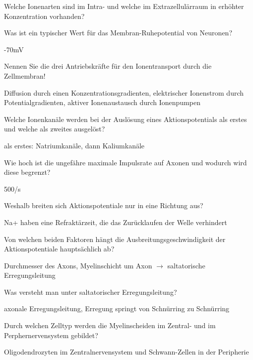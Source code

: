 \documentclass[10pt, a4paper]{exam}
\begin{document}
\begin{questions}
  \question Welche Ionenarten sind im Intra- und welche im Extrazellulärraum in erhöhter Konzentration vorhanden?
  \begin{solution}

  \end{solution}

  \question Was ist ein typischer Wert für das Membran-Ruhepotential von Neuronen?
  \begin{solution}
    -70mV
  \end{solution}

  \question Nennen Sie die drei Antriebskräfte für den Ionentransport durch die Zellmembran!
  \begin{solution}
    Diffusion durch einen Konzentrationsgradienten, elektrischer Ionenstrom durch Potentialgradienten, aktiver Ionenaustausch durch Ionenpumpen
  \end{solution}

  \question Welche Ionenkanäle werden bei der Auslösung eines Aktionspotentials als erstes und welche als zweites ausgelöst?
  \begin{solution}
    als erstes: Natriumkanäle, dann Kaliumkanäle
  \end{solution}

  \question Wie hoch ist die ungefähre maximale Impulsrate auf Axonen und wodurch wird diese begrenzt?
  \begin{solution}
    500/s
  \end{solution}

  \question Weshalb breiten sich Aktionspotentiale nur in eine Richtung aus?
  \begin{solution}
    Na+ haben eine Refraktärzeit, die das Zurücklaufen der Welle verhindert
  \end{solution}

  \question Von welchen beiden Faktoren hängt die Ausbreitungsgeschwindigkeit der Aktionspotentiale hauptsächlich ab?
  \begin{solution}
    Durchmesser des Axons, Myelinschicht um Axon $\rightarrow$ saltatorische Erregungsleitung
  \end{solution}

  \question Was versteht man unter saltatorischer Erregungsleitung?
  \begin{solution}
    axonale Erregungsleitung, Erregung springt von Schnürring zu Schnürring
  \end{solution}

  \question Durch welchen Zelltyp werden die Myelinscheiden im Zentral- und im Perphernervensystem gebildet?
  \begin{solution}
    Oligodendrozyten im Zentralnervensystem und Schwann-Zellen in der Peripherie
  \end{solution}


\end{questions}
\end{document}
